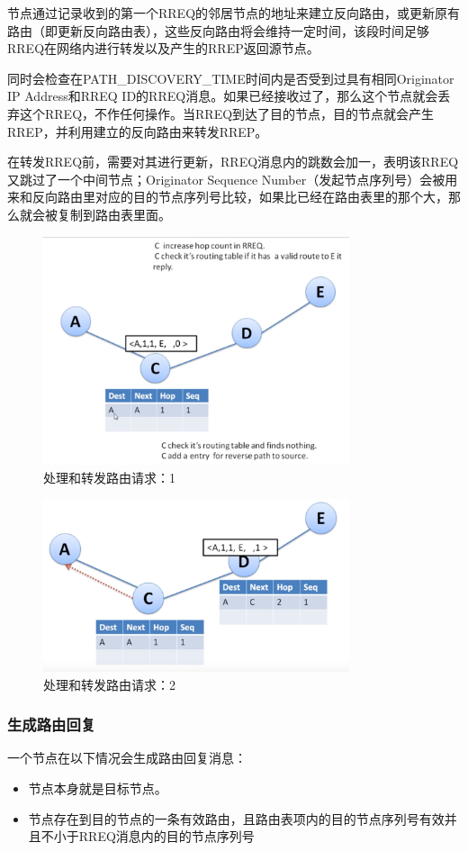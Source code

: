 \documentclass[12pt,a4paper]{article}
\begin{document}
节点通过记录收到的第一个RREQ的邻居节点的地址来建立反向路由，或更新原有路由（即更新反向路由表），这些反向路由将会维持一定时间，该段时间足够RREQ在网络内进行转发以及产生的RREP返回源节点。

同时会检查在PATH\_DISCOVERY\_TIME时间内是否受到过具有相同Originator IP Address和RREQ ID的RREQ消息。如果已经接收过了，那么这个节点就会丢弃这个RREQ，不作任何操作。当RREQ到达了目的节点，目的节点就会产生RREP，并利用建立的反向路由来转发RREP。

在转发RREQ前，需要对其进行更新，RREQ消息内的跳数会加一，表明该RREQ又跳过了一个中间节点；Originator Sequence Number（发起节点序列号）会被用来和反向路由里对应的目的节点序列号比较，如果比已经在路由表里的那个大，那么就会被复制到路由表里面。

\begin{figure}[htb]
\centering
\includegraphics[width=9cm]{handle_route_request_1}
\caption{处理和转发路由请求：1}
\end{figure}

\begin{figure}[htb]
\centering
\includegraphics[width=9cm]{handle_route_request_2}
\caption{处理和转发路由请求：2}
\end{figure}

\subsubsection{生成路由回复}
一个节点在以下情况会生成路由回复消息：
\begin{itemize}
	\item 节点本身就是目标节点。
	\item 节点存在到目的节点的一条有效路由，且路由表项内的目的节点序列号有效并且不小于RREQ消息内的目的节点序列号
\end{itemize}
\end{document}
